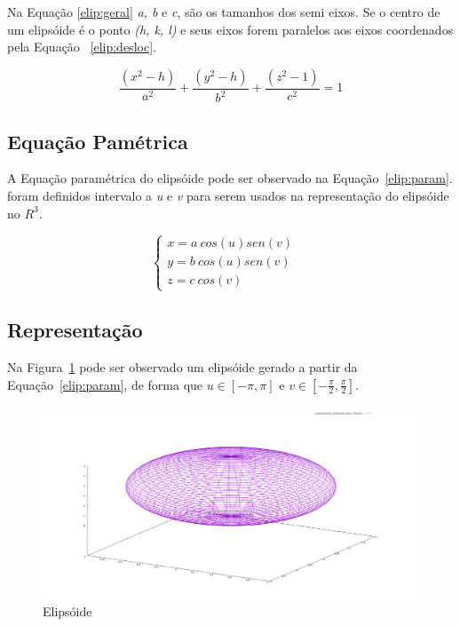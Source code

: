 \documentclass[
	article,			%
	11pt,				%
	oneside,			%
	a4paper,			%
	english,			%
	brazil,				%
	]{abntex2}
\begin{document}
		Na Equação \ref{elip:geral} \emph{a, b} e \emph{c}, são os tamanhos dos
		semi eixos. Se o centro de um elipsóide é o ponto \emph{(h, k, l)} e
		seus eixos forem paralelos aos eixos coordenados pela Equação
		~\ref{elip:desloc}.

		\begin{equation}\label{elip:desloc}
			\frac{(x^2-h)}{a^2}+\frac{(y^2-h)}{b^2}+\frac{(z^2-1)}{c^2}=1
		\end{equation}


		\subsection{Equação Pamétrica}

		A Equação paramétrica do elipsóide pode ser observado na
		Equação~\ref{elip:param}. foram definidos intervalo a \emph{u} e
		\emph{v} para serem usados na representação do elipsóide no $R^3$.
		
		\begin{equation}\label{elip:param}
			\begin{cases}
				x = a\ cos(u) sen(v) &~\\
				y = b\ cos(u) sen(v) &~\\
				z = c\ cos(v) 
			\end{cases}
		\end{equation}


		\subsection{Representação}

		Na Figura~\ref{img:elip} pode ser observado um elipsóide gerado a partir
		da Equação~\ref{elip:param}, de forma que $u\in[-\pi,\pi]$ e
		$v\in[-\frac{\pi}{2}, \frac{\pi}{2}]$.

		\begin{figure}[H]
			\includegraphics[width=\textwidth,keepaspectratio]{ellipsoid.png}
			\caption{Elipsóide}
			\label{img:elip}
		\end{figure}
\end{document}
